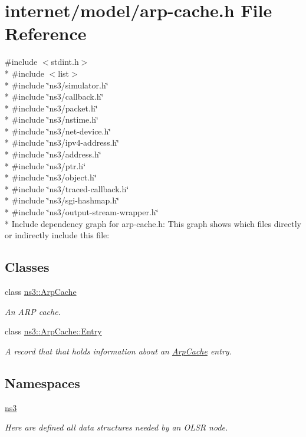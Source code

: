 \hypertarget{arp-cache_8h}{}\section{internet/model/arp-\/cache.h File Reference}
\label{arp-cache_8h}
{\ttfamily \#include $<$stdint.\+h$>$}\\*
{\ttfamily \#include $<$list$>$}\\*
{\ttfamily \#include \char`\"{}ns3/simulator.\+h\char`\"{}}\\*
{\ttfamily \#include \char`\"{}ns3/callback.\+h\char`\"{}}\\*
{\ttfamily \#include \char`\"{}ns3/packet.\+h\char`\"{}}\\*
{\ttfamily \#include \char`\"{}ns3/nstime.\+h\char`\"{}}\\*
{\ttfamily \#include \char`\"{}ns3/net-\/device.\+h\char`\"{}}\\*
{\ttfamily \#include \char`\"{}ns3/ipv4-\/address.\+h\char`\"{}}\\*
{\ttfamily \#include \char`\"{}ns3/address.\+h\char`\"{}}\\*
{\ttfamily \#include \char`\"{}ns3/ptr.\+h\char`\"{}}\\*
{\ttfamily \#include \char`\"{}ns3/object.\+h\char`\"{}}\\*
{\ttfamily \#include \char`\"{}ns3/traced-\/callback.\+h\char`\"{}}\\*
{\ttfamily \#include \char`\"{}ns3/sgi-\/hashmap.\+h\char`\"{}}\\*
{\ttfamily \#include \char`\"{}ns3/output-\/stream-\/wrapper.\+h\char`\"{}}\\*
Include dependency graph for arp-\/cache.h\+:
This graph shows which files directly or indirectly include this file\+:
\subsection*{Classes}
\begin{DoxyCompactItemize}
\item 
class \hyperlink{classns3_1_1ArpCache}{ns3\+::\+Arp\+Cache}
\begin{DoxyCompactList}\small\item\em An A\+RP cache. \end{DoxyCompactList}\item 
class \hyperlink{classns3_1_1ArpCache_1_1Entry}{ns3\+::\+Arp\+Cache\+::\+Entry}
\begin{DoxyCompactList}\small\item\em A record that that holds information about an \hyperlink{classns3_1_1ArpCache}{Arp\+Cache} entry. \end{DoxyCompactList}\end{DoxyCompactItemize}
\subsection*{Namespaces}
\begin{DoxyCompactItemize}
\item 
 \hyperlink{namespacens3}{ns3}
\begin{DoxyCompactList}\small\item\em Here are defined all data structures needed by an O\+L\+SR node. \end{DoxyCompactList}\end{DoxyCompactItemize}
